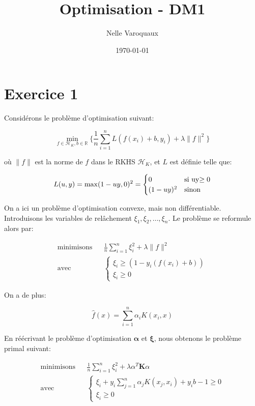 \documentclass{article}
\date{\today}
\title{Optimisation - DM1}
\author{Nelle Varoquaux}
\DeclareMathOperator{\minimisons}{minimisons}
\DeclareMathOperator{\contraintes}{avec}
\begin{document}
\maketitle

\section{Exercice 1}

Considérons le problème d'optimisation suivant:

\begin{equation*}
\min_{f \in \mathcal{H}_K, b \in \mathbb{R}} \{ \frac{1}{n} \sum_{i = 1}^n L
(f(x_i) + b,y_i) + \lambda \| f \|^2\}
\end{equation*}

où $\|f\|$ est la norme de $f$ dans le RKHS $\mathcal{H}_K$, et $L$ est
définie telle que:

\begin{equation*}
L(u, y) = \max(1 - uy, 0)^2  = \begin{cases}
			      0 & \mbox{si   } $uy$ \geq 0 \\
			      (1 - uy)^2 & \mbox{sinon}
			      \end{cases}
\end{equation*}

On a ici un problème d'optimisation convexe, mais non différentiable.
Introduisons les variables de relâchement $\xi_1, \xi_2, \dots, \xi_n$.
Le problème se reformule alors par:

\begin{align*}
\minimisons &  & \frac{1}{n} \sum_{i = 1}^n \xi_i^2 + \lambda \| f \|^2 \\
\contraintes & & \begin{cases}
		  \xi_i \geq (1 - y_i (f(x_i) + b)) \\
		  \xi_i \geq 0
		 \end{cases}
\end{align*}

On a de plus:

\begin{equation*}
\hat{f}(x) = \sum_{i = 1}^n \alpha_i K(x_i, x)
\end{equation*}

En réécrivant le problème d'optimisation $\mathbf{\alpha}$ et $\mathbf{\xi}$,
nous obtenons le problème primal suivant:

\begin{align*}
\minimisons &  & \frac{1}{n} \sum_{i = 1}^n \xi_i^2 + \lambda \alpha^T
\mathbf{K} \alpha \\
\contraintes & & \begin{cases}
		  \xi_i  + y_i \sum_{j = 1}^n \alpha_j K(x_j, x_i) + y_i b - 1 \geq 0\\
		  \xi_i \geq 0
		 \end{cases}
\end{align*}
\end{document}
